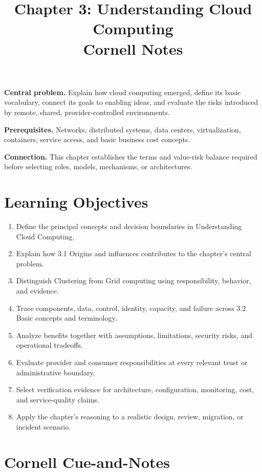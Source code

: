 \documentclass[11pt]{article}
\title{Chapter 3: Understanding Cloud Computing\\[2mm]\large Cornell Notes}
\author{}
\date{}
\begin{document}
\maketitle
\thispagestyle{fancy}
\vspace{-1.5em}
\begin{orientationbox}
\textbf{Central problem.} Explain how cloud computing emerged, define its basic vocabulary, connect its goals to enabling ideas, and evaluate the risks introduced by remote, shared, provider-controlled environments.\par\smallskip
\textbf{Prerequisites.} Networks, distributed systems, data centers, virtualization, containers, service access, and basic business cost concepts.\par\smallskip
\textbf{Connection.} This chapter establishes the terms and value-risk balance required before selecting roles, models, mechanisms, or architectures.
\end{orientationbox}
\section{Learning Objectives}
\begin{enumerate}
\item Define the principal concepts and decision boundaries in Understanding Cloud Computing.
\item Explain how 3.1 Origins and influences contributes to the chapter's central problem.
\item Distinguish Clustering from Grid computing using responsibility, behavior, and evidence.
\item Trace components, data, control, identity, capacity, and failure across 3.2 Basic concepts and terminology.
\item Analyze benefits together with assumptions, limitations, security risks, and operational tradeoffs.
\item Evaluate provider and consumer responsibilities at every relevant trust or administrative boundary.
\item Select verification evidence for architecture, configuration, monitoring, cost, and service-quality claims.
\item Apply the chapter's reasoning to a realistic design, review, migration, or incident scenario.
\end{enumerate}
\section{Cornell Cue-and-Notes}
\end{document}
